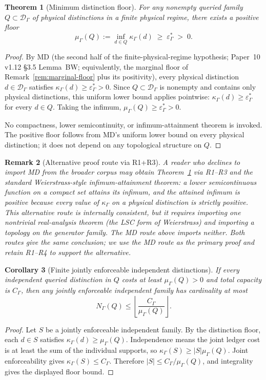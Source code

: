 \documentclass[11pt]{article}
\newtheorem{theorem}{Theorem}[section]
\newtheorem{corollary}[theorem]{Corollary}
\newtheorem{remark}[theorem]{Remark}
\begin{document}
\begin{theorem}[Minimum distinction floor]\label{thm:minimum-distinction-floor}
For any nonempty queried family $Q\subset\mathcal D_\Gamma$ of physical distinctions in a finite physical regime, there exists a positive floor
\[
 \mu_\Gamma(Q):=\inf_{d\in Q}\kappa_\Gamma(d) \;\ge\; \varepsilon^*_\Gamma \;>\; 0.
\]
\end{theorem}
\begin{proof}
By MD (the second half of the finite-physical-regime hypothesis; Paper~10 v1.12 \S3.5 Lemma~BW; equivalently, the marginal floor of Remark~\ref{rem:marginal-floor} plus its positivity), every physical distinction $d \in \mathcal D_\Gamma$ satisfies $\kappa_\Gamma(d) \ge \varepsilon^*_\Gamma > 0$.  Since $Q\subset\mathcal D_\Gamma$ is nonempty and contains only physical distinctions, this uniform lower bound applies pointwise: $\kappa_\Gamma(d) \ge \varepsilon^*_\Gamma$ for every $d\in Q$.  Taking the infimum, $\mu_\Gamma(Q) \ge \varepsilon^*_\Gamma > 0$.

No compactness, lower semicontinuity, or infimum-attainment theorem is invoked.  The positive floor follows from MD's uniform lower bound on every physical distinction; it does not depend on any topological structure on $Q$.
\end{proof}

\begin{remark}[Alternative proof route via R1+R3]\label{rem:weierstrass-alternative-route}
A reader who declines to import MD from the broader corpus may obtain Theorem~\ref{thm:minimum-distinction-floor} via R1--R3 and the standard Weierstrass-style infimum-attainment theorem: a lower semicontinuous function on a compact set attains its infimum, and the attained infimum is positive because every value of $\kappa_\Gamma$ on a physical distinction is strictly positive.  This alternative route is internally consistent, but it requires importing one nontrivial real-analysis theorem (the LSC form of Weierstrass) and importing a topology on the generator family.  The MD route above imports neither.  Both routes give the same conclusion; we use the MD route as the primary proof and retain R1--R4 to support the alternative.
\end{remark}

\begin{corollary}[Finite jointly enforceable independent distinctions]\label{cor:finite-independent-distinctions}
If every independent queried distinction in $Q$ costs at least $\mu_\Gamma(Q)>0$ and total capacity is $C_\Gamma$, then any jointly enforceable independent family has cardinality at most
\[
 N_\Gamma(Q)\le \left\lfloor \frac{C_\Gamma}{\mu_\Gamma(Q)}\right\rfloor .
\]
\end{corollary}
\begin{proof}
Let $S$ be a jointly enforceable independent family.  By the distinction floor, each $d\in S$ satisfies $\kappa_\Gamma(d)\ge\mu_\Gamma(Q)$.  Independence means the joint ledger cost is at least the sum of the individual supports, so $\kappa_\Gamma(S)\ge |S|\mu_\Gamma(Q)$.  Joint enforceability gives $\kappa_\Gamma(S)\le C_\Gamma$.  Therefore $|S|\le C_\Gamma/\mu_\Gamma(Q)$, and integrality gives the displayed floor bound.
\end{proof}
\end{document}
